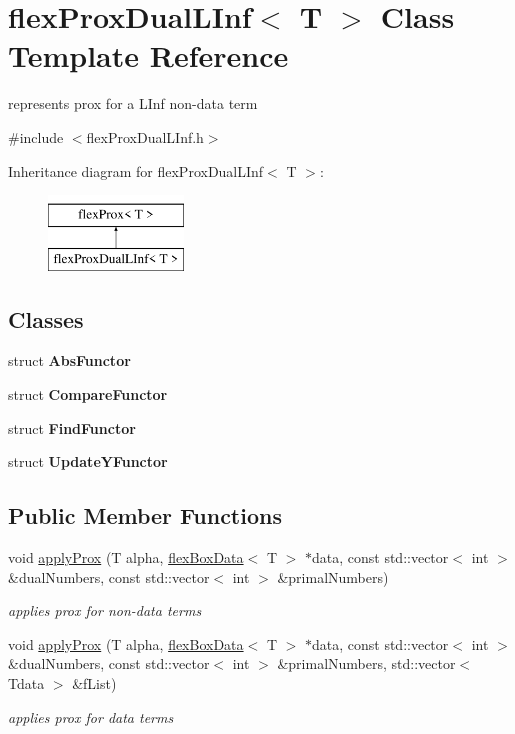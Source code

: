 \hypertarget{classflex_prox_dual_l_inf}{}\section{flex\+Prox\+Dual\+L\+Inf$<$ T $>$ Class Template Reference}
\label{classflex_prox_dual_l_inf}


represents prox for a L\+Inf non-\/data term  




{\ttfamily \#include $<$flex\+Prox\+Dual\+L\+Inf.\+h$>$}

Inheritance diagram for flex\+Prox\+Dual\+L\+Inf$<$ T $>$\+:\begin{figure}[H]
\begin{center}
\leavevmode
\includegraphics[height=2.000000cm]{classflex_prox_dual_l_inf}
\end{center}
\end{figure}
\subsection*{Classes}
\begin{DoxyCompactItemize}
\item 
struct {\bfseries Abs\+Functor}
\item 
struct {\bfseries Compare\+Functor}
\item 
struct {\bfseries Find\+Functor}
\item 
struct {\bfseries Update\+Y\+Functor}
\end{DoxyCompactItemize}
\subsection*{Public Member Functions}
\begin{DoxyCompactItemize}
\item 
void \hyperlink{classflex_prox_dual_l_inf_a90e3ad5244d8bf6cef50541593fb9da0}{apply\+Prox} (T alpha, \hyperlink{classflex_box_data}{flex\+Box\+Data}$<$ T $>$ $\ast$data, const std\+::vector$<$ int $>$ \&dual\+Numbers, const std\+::vector$<$ int $>$ \&primal\+Numbers)
\begin{DoxyCompactList}\small\item\em applies prox for non-\/data terms \end{DoxyCompactList}\item 
void \hyperlink{classflex_prox_dual_l_inf_a3ead6ede3f9535c5540c91955f83313b}{apply\+Prox} (T alpha, \hyperlink{classflex_box_data}{flex\+Box\+Data}$<$ T $>$ $\ast$data, const std\+::vector$<$ int $>$ \&dual\+Numbers, const std\+::vector$<$ int $>$ \&primal\+Numbers, std\+::vector$<$ Tdata $>$ \&f\+List)
\begin{DoxyCompactList}\small\item\em applies prox for data terms \end{DoxyCompactList}\end{DoxyCompactItemize}
